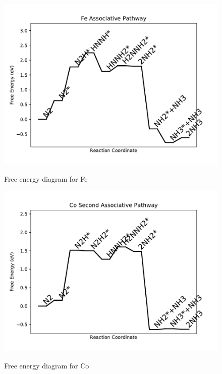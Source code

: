 \documentclass{article}
\begin{document}
\begin{figure}
\includegraphics[width=1\linewidth]{data/plots/Fe_associative.pdf}
\label{fig:Fe_associative}
\caption{Free energy diagram for Fe}
\end{figure}

\clearpage
\begin{figure}
\includegraphics[width=1\linewidth]{data/plots/Co_associative_2.pdf}
\label{fig:Co_associative_2}
\caption{Free energy diagram for Co}
\end{figure}
\end{document}
